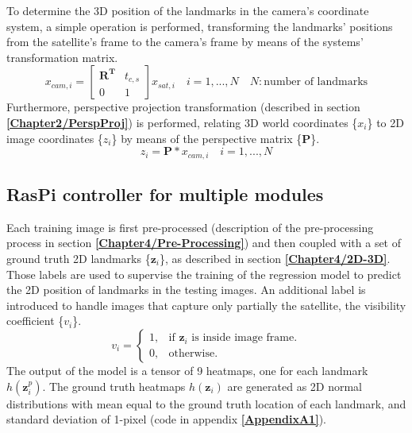 To determine the 3D position of the landmarks in the camera's coordinate system, a simple operation is performed, transforming the landmarks' positions from the satellite's frame to the camera's frame by means of the systems' transformation matrix.
\begin{equation}
    x_{cam,i} = 
\begin{bmatrix}
    \textbf{R}^\textbf{T} & t_{c,s}\\
    0 & 1
\end{bmatrix}
x_{sat,i} \quad i = 1,...,N \quad N:\textrm{number of landmarks}
\end{equation}
Furthermore, perspective projection transformation (described in section \textbf{\ref{Chapter2/PerspProj}}) is performed, relating 3D world coordinates \{\(x_{i}\)\} to 2D image coordinates \{\(z_{i}\)\} by means of the perspective matrix \{\(\textbf{P}\)\}.
\begin{equation}
    z_{i} = \textbf{P}*x_{cam,i} \quad i = 1,...,N
\end{equation}

\newpage
\subsection{RasPi controller for multiple modules}
\label{Chapter4/LandReg}
Each training image is first pre-processed (description of the pre-processing process in section \textbf{\ref{Chapter4/Pre-Processing}}) and then coupled with a set of ground truth 2D landmarks \{\(\textbf{z}_{i}\)\}, as described in section \textbf{\ref{Chapter4/2D-3D}}. Those labels are used to supervise the training of the regression model to predict the 2D position of landmarks in the testing images. An additional label is introduced to handle images that capture only partially the satellite, the visibility coefficient \{\(v_{i}\)\}.
\begin{equation}
  v_{i}=\begin{cases}
    1, & \text{if $\textbf{z}_{i}$ is inside image frame}.\\
    0, & \text{otherwise}.
  \end{cases}
\end{equation}
The output of the model is a tensor of 9 heatmaps, one for each landmark $h(\textbf{z}_{i}^p)$. The ground truth heatmaps $h(\textbf{z}_{i})$ are generated as 2D normal distributions with mean equal to the ground truth location of each landmark, and standard deviation of 1-pixel (code in appendix \textbf{\ref{AppendixA1}}).

